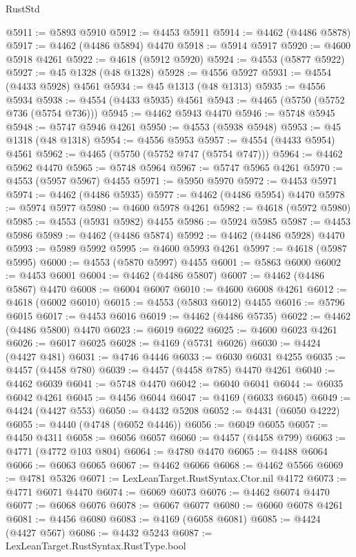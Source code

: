 \begin{lexlean}{RustStd}
\begin{coremodule}
@5911 := @5893 @5910
@5912 := @4453 @5911
@5914 := @4462 (@4486 @5878)
@5917 := @4462 (@4486 @5894) @4470
@5918 := @5914 @5917
@5920 := @4600 @5918 @4261
@5922 := @4618 (@5912 @5920)
@5924 := @4553 (@5877 @5922)
@5927 := @45 @1328 (@48 @1328)
@5928 := @4556 @5927
@5931 := @4554 (@4433 @5928) @4561
@5934 := @45 @1313 (@48 @1313)
@5935 := @4556 @5934
@5938 := @4554 (@4433 @5935) @4561
@5943 := @4465 (@5750 (@5752 @736 (@5754 @736)))
@5945 := @4462 @5943 @4470
@5946 := @5748 @5945
@5948 := @5747 @5946 @4261
@5950 := @4553 (@5938 @5948)
@5953 := @45 @1318 (@48 @1318)
@5954 := @4556 @5953
@5957 := @4554 (@4433 @5954) @4561
@5962 := @4465 (@5750 (@5752 @747 (@5754 @747)))
@5964 := @4462 @5962 @4470
@5965 := @5748 @5964
@5967 := @5747 @5965 @4261
@5970 := @4553 (@5957 @5967) @4455
@5971 := @5950 @5970
@5972 := @4453 @5971
@5974 := @4462 (@4486 @5935)
@5977 := @4462 (@4486 @5954) @4470
@5978 := @5974 @5977
@5980 := @4600 @5978 @4261
@5982 := @4618 (@5972 @5980)
@5985 := @4553 (@5931 @5982) @4455
@5986 := @5924 @5985
@5987 := @4453 @5986
@5989 := @4462 (@4486 @5874)
@5992 := @4462 (@4486 @5928) @4470
@5993 := @5989 @5992
@5995 := @4600 @5993 @4261
@5997 := @4618 (@5987 @5995)
@6000 := @4553 (@5870 @5997) @4455
@6001 := @5863 @6000
@6002 := @4453 @6001
@6004 := @4462 (@4486 @5807)
@6007 := @4462 (@4486 @5867) @4470
@6008 := @6004 @6007
@6010 := @4600 @6008 @4261
@6012 := @4618 (@6002 @6010)
@6015 := @4553 (@5803 @6012) @4455
@6016 := @5796 @6015
@6017 := @4453 @6016
@6019 := @4462 (@4486 @5735)
@6022 := @4462 (@4486 @5800) @4470
@6023 := @6019 @6022
@6025 := @4600 @6023 @4261
@6026 := @6017 @6025
@6028 := @4169 (@5731 @6026)
@6030 := @4424 (@4427 @481)
@6031 := @4746 @4446
@6033 := @6030 @6031 @4255
@6035 := @4457 (@4458 @780)
@6039 := @4457 (@4458 @785) @4470 @4261
@6040 := @4462 @6039
@6041 := @5748 @4470
@6042 := @6040 @6041
@6044 := @6035 @6042 @4261
@6045 := @4456 @6044
@6047 := @4169 (@6033 @6045)
@6049 := @4424 (@4427 @553)
@6050 := @4432 @5208
@6052 := @4431 (@6050 @4222)
@6055 := @4440 (@4748 (@6052 @4446))
@6056 := @6049 @6055
@6057 := @4450 @4311
@6058 := @6056 @6057
@6060 := @4457 (@4458 @799)
@6063 := @4771 (@4772 @103 @804)
@6064 := @4780 @4470
@6065 := @4488 @6064
@6066 := @6063 @6065
@6067 := @4462 @6066
@6068 := @4462 @5566
@6069 := @4781 @5326
@6071 := LexLeanTarget.RustSyntax.Ctor.nil @4172
@6073 := @4771 @6071 @4470
@6074 := @6069 @6073
@6076 := @4462 @6074 @4470
@6077 := @6068 @6076
@6078 := @6067 @6077
@6080 := @6060 @6078 @4261
@6081 := @4456 @6080
@6083 := @4169 (@6058 @6081)
@6085 := @4424 (@4427 @567)
@6086 := @4432 @5243
@6087 := LexLeanTarget.RustSyntax.RustType.bool

\end{coremodule}
\end{lexlean}
